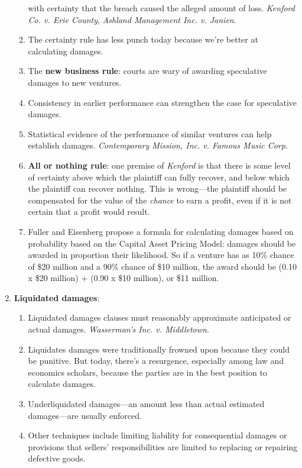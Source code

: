 \begin{enumerate}
\begin{enumerate}
        with certainty that the breach caused the alleged amount of loss. 
        \emph{Kenford Co. v. Erie County}, \emph{Ashland Management Inc. v. 
        Janien}.
        \item The certainty rule has less punch today because we're better at 
        calculating damages.
        \item The \textbf{new business rule}: courts are wary of awarding 
        speculative damages to new ventures.
        \item Consistency in earlier performance can strengthen the case for 
        speculative damages.
        \item Statistical evidence of the performance of similar ventures can 
        help establish damages. \emph{Contemporary Mission, Inc. v. Famous 
        Music Corp.}
        \item \textbf{All or nothing rule}: one premise of \emph{Kenford} is 
        that there is some level of certainty above which the plaintiff can 
        fully recover, and below which the plaintiff can recover nothing. This 
        is wrong---the plaintiff should be compensated for the value of the 
        \emph{chance} to earn a profit, even if it is not certain that a 
        profit would result.
        \item Fuller and Eisenberg propose a formula for calculating damages 
        based on probability based on the Capital Asset Pricing Model: damages 
        should be awarded in proportion their likelihood.  So if a venture has 
        as 10\% chance of \$20 million and a 90\% chance of \$10 million, the 
        award should be (0.10 x \$20 million) + (0.90 x \$10 million), or \$11 
        million.
    \end{enumerate}
    \item \textbf{Liquidated damages}:
    \begin{enumerate}
        \item Liquidated damages clauses must reasonably approximate 
        anticipated or actual damages. \emph{Wasserman's Inc. v. Middletown}.
        \item Liquidates damages were traditionally frowned upon because they 
        could be punitive. But today, there's a resurgence, especially among 
        law and economics scholars, because the parties are in the best 
        position to calculate damages.
        \item Underliquidated damages---an amount less than actual estimated 
        damages---are usually enforced.
        \item Other techniques include limiting liability for consequential 
        damages or provisions that sellers' responsibilities are limited to 
        replacing or repairing defective goods.
    \end{enumerate}
\end{enumerate}

